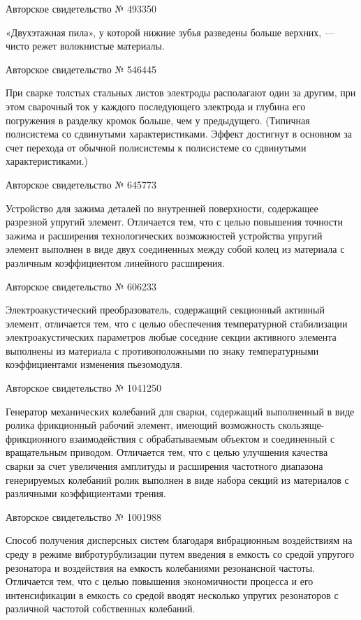 Авторское свидетельство № 493350

«Двухэтажная пила», у которой нижние зубья разведены больше верхних, —
чисто режет волокнистые материалы.


Авторское свидетельство № 546445

При  сварке  толстых стальных  листов  электроды  располагают один  за
другим,  при этом  сварочный ток  у каждого  последующего электрода  и
глубина его  погружения в разделку  кромок больше, чем  у предыдущего.
(Типичная полисистема со сдвинутыми характеристиками. Эффект достигнут
в основном  за счет перехода  от обычной полисистемы к  полисистеме со
сдвинутыми характеристиками.)


Авторское свидетельство № 645773

Устройство для  зажима деталей  по внутренней  поверхности, содержащее
разрезной  упругий  элемент. Отличается  тем,  что  с целью  повышения
точности зажима  и расширения технологических  возможностей устройства
упругий элемент выполнен в виде  двух соединенных между собой колец из
материала с различным коэффициентом линейного расширения.


Авторское свидетельство № 606233

Электроакустический  преобразователь,  содержащий секционный  активный
элемент,  отличается  тем,  что   с  целью  обеспечения  температурной
стабилизации  электроакустических  параметров  любые  соседние  секции
активного элемента выполнены из  материала с противоположными по знаку
температурными коэффициентами изменения пьезомодуля.


Авторское свидетельство № 1041250

Генератор  механических колебаний  для сварки,  содержащий выполненный
в  виде  ролика  фрикционный   рабочий  элемент,  имеющий  возможность
скользяще-фрикционного  взаимодействия  с  обрабатываемым  объектом  и
соединенный  с  вращательным приводом.  Отличается  тем,  что с  целью
улучшения качества  сварки за  счет увеличения амплитуды  и расширения
частотного  диапазона генерируемых  колебаний  ролик  выполнен в  виде
набора секций из материалов с различными коэффициентами трения.


Авторское свидетельство № 1001988

Способ получения дисперсных систем благодаря вибрационным воздействиям
на среду в режиме вибротурбулизации путем введения в емкость со средой
упругого резонатора  и воздействия на емкость  колебаниями резонансной
частоты. Отличается тем, что  с целью повышения экономичности процесса
и  его интенсификации  в емкость  со средой  вводят несколько  упругих
резонаторов с различной частотой собственных колебаний.


